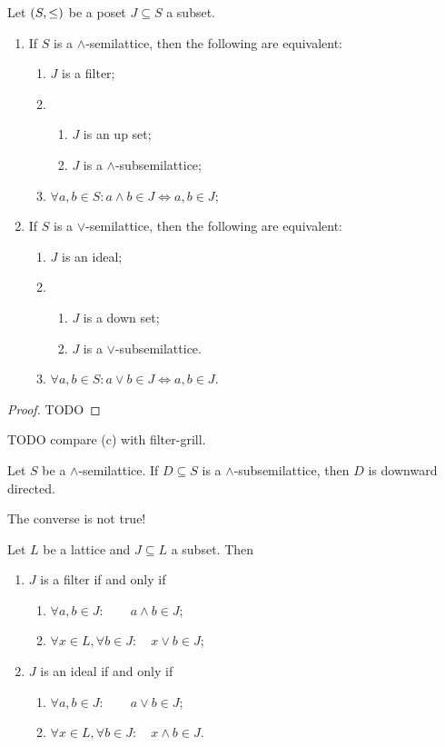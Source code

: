 \begin{lemma}
Let $\left( S,\leq \right)$ be a poset $J\subseteq S$ a subset.
\begin{enumerate}
\item If $S$ is a $\wedge$-semilattice, then the following are equivalent:
\begin{enumerate}
\item $J$ is a filter;
\item \begin{enumerate}
\item $J$ is an up set;
\item $J$ is a $\wedge$-subsemilattice;
\end{enumerate}
\item $\forall a,b\in S: a\wedge b\in J \iff a,b\in J$;
\end{enumerate}
\item If $S$ is a $\vee$-semilattice, then the following are equivalent:
\begin{enumerate}
\item $J$ is an ideal;
\item \begin{enumerate}
\item $J$ is a down set;
\item $J$ is a $\vee$-subsemilattice.
\end{enumerate}
\item $\forall a,b\in S: a\vee b\in J \iff a,b\in J$.
\end{enumerate}
\end{enumerate}
\end{lemma}
\begin{proof}
TODO
\end{proof}

TODO compare (c) with filter-grill.

\begin{lemma}
Let $S$ be a $\wedge$-semilattice. If $D\subseteq S$ is a $\wedge$-subsemilattice, then $D$ is downward directed.
\end{lemma}
The converse is not true!



\begin{lemma}
Let $L$ be a lattice and $J\subseteq L$ a subset. Then
\begin{enumerate}
\item $J$ is a filter \textup{if and only if}
\begin{enumerate}
\item $\forall a,b\in J: \qquad a\wedge b\in J$;
\item $\forall x\in L, \forall b\in J: \quad x\vee b \in J$;
\end{enumerate}
\item $J$ is an ideal \textup{if and only if}
\begin{enumerate}
\item $\forall a,b\in J: \qquad a\vee b\in J$;
\item $\forall x\in L, \forall b\in J: \quad x\wedge b \in J$.
\end{enumerate}
\end{enumerate}
\end{lemma}


